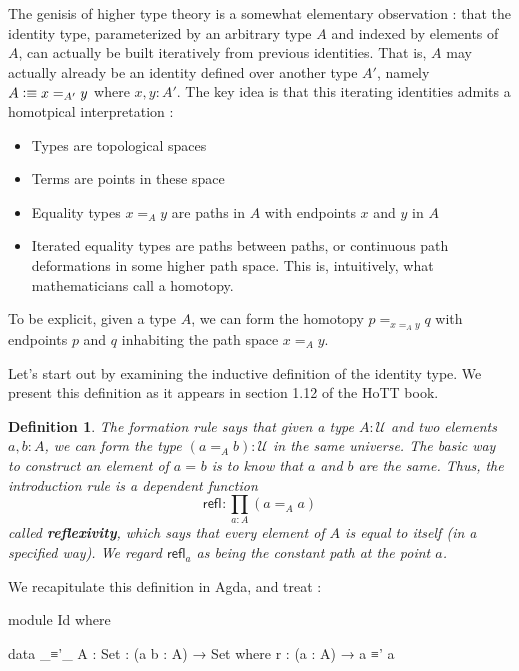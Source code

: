 \documentclass[11pt, a4paper]{article}
\newtheorem{definition}{Definition}
\newcommand{\refl}[1]{\ensuremath{\mathsf{refl}_{#1}}\xspace}
\newcommand{\define}[1]{\textbf{#1}}
\newcommand{\defeq}{\vcentcolon\equiv}  %
\newcommand{\id}[3][]{\ensuremath{#2 =_{#1} #3}\xspace}
\newcommand{\UU}{\ensuremath{\mathcal{U}}\xspace}
\begin{document}
The genisis of higher type theory is a somewhat elementary observation : that
the identity type, parameterized by an arbitrary type $A$ and indexed by
elements of $A$, can actually be built iteratively from previous identities.
That is, $A$ may actually already be an identity defined over another type
$A'$, namely $A \defeq x=_{A'} y$ where $x,y:A'$. The key idea is that this
iterating identities admits a homotpical interpretation : 

\begin{itemize}[noitemsep]

\item Types are topological spaces
\item Terms are points in these space

\item Equality types $x=_{A} y$ are paths in $A$ with endpoints $x$ and $y$ in
$A$

\item Iterated equality types are paths between paths, or continuous path
deformations in some higher path space. This is, intuitively, what
mathematicians call a homotopy.

\end{itemize}

To be explicit, given a type $A$, we can form the homotopy $p=_{x=_{A} y}q$
with endpoints $p$ and $q$ inhabiting the path space $x=_{A} y$.

Let's start out by examining the inductive definition of the identity type.  We
present this definition as it appears in section 1.12 of the HoTT book.

\begin{definition}
  The formation rule says that given a type $A:\UU$ and two elements $a,b:A$, we can form the type $(\id[A]{a}{b}):\UU$ in the same universe.
  The basic way to construct an element of $\id{a}{b}$ is to know that $a$ and $b$ are the same.
  Thus, the introduction rule is a dependent function
  \[\refl{} : \prod_{a:A} (\id[A]{a}{a}) \]
  called \define{reflexivity},
  which says that every element of $A$ is equal to itself (in a specified way).  We regard $\refl{a}$ as being the
  constant path %
  at the point $a$.
\end{definition}

We recapitulate this definition in Agda, and treat : 

\begin{code}[hide]

module Id where

\end{code}
\begin{code}

  data _≡'_ {A : Set} : (a b : A) → Set where
    r : (a : A) → a ≡' a

\end{code}
\end{document}
